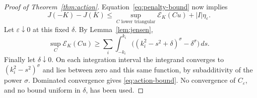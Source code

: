 \begin{proof}[Proof of Theorem~\ref{thm:action}]
Equation~\eqref{eq:penalty-bound} now implies
\[
 J(-K)-J(K)\le
 \sup_{C\text{ lower triangular}}\mathcal E_K(Cu)+|I|\eta_\varepsilon.
\]
Let $\varepsilon\downarrow0$ at this fixed $\delta$. By
Lemma~\ref{lem:jensen},
\[
 \sup_C\mathcal E_K(Cu)
 \ge\sum_i\int_{-k_i}^{k_i}
       \bigl((k_i^2-s^2+\delta)^\sigma-\delta^\sigma\bigr)\,ds.
\]
Finally let $\delta\downarrow0$. On each integration interval the integrand
converges to $(k_i^2-s^2)^\sigma$ and lies between zero and this same function,
by subadditivity of the power $\sigma$. Dominated convergence gives
\eqref{eq:action-bound}. No convergence of $C_\varepsilon$, and no bound
uniform in $\delta$, has been used.
\end{proof}
